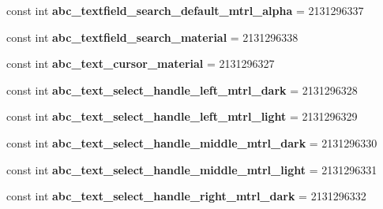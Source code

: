 \begin{DoxyCompactItemize}
const int {\bfseries abc\+\_\+textfield\+\_\+search\+\_\+default\+\_\+mtrl\+\_\+alpha} = 2131296337
\item 
\mbox{\label{classst_delivery_1_1_resource_1_1_drawable_a6d89a5a9436ef0975857610907eb5f20}} 
const int {\bfseries abc\+\_\+textfield\+\_\+search\+\_\+material} = 2131296338
\item 
\mbox{\label{classst_delivery_1_1_resource_1_1_drawable_a0cc3cac1396589d7ee1522c457b14227}} 
const int {\bfseries abc\+\_\+text\+\_\+cursor\+\_\+material} = 2131296327
\item 
\mbox{\label{classst_delivery_1_1_resource_1_1_drawable_a048ab4640415f05f9029504472f42b7c}} 
const int {\bfseries abc\+\_\+text\+\_\+select\+\_\+handle\+\_\+left\+\_\+mtrl\+\_\+dark} = 2131296328
\item 
\mbox{\label{classst_delivery_1_1_resource_1_1_drawable_abffb3b9f67fa9042c8ed29ab31198b34}} 
const int {\bfseries abc\+\_\+text\+\_\+select\+\_\+handle\+\_\+left\+\_\+mtrl\+\_\+light} = 2131296329
\item 
\mbox{\label{classst_delivery_1_1_resource_1_1_drawable_a78ee71500ae1a8889a3998488ae3a989}} 
const int {\bfseries abc\+\_\+text\+\_\+select\+\_\+handle\+\_\+middle\+\_\+mtrl\+\_\+dark} = 2131296330
\item 
\mbox{\label{classst_delivery_1_1_resource_1_1_drawable_ad3fc03fe4075bd439a973d828a578fda}} 
const int {\bfseries abc\+\_\+text\+\_\+select\+\_\+handle\+\_\+middle\+\_\+mtrl\+\_\+light} = 2131296331
\item 
\mbox{\label{classst_delivery_1_1_resource_1_1_drawable_a3179fa3704b6565abeeb8575c3c43ef5}} 
const int {\bfseries abc\+\_\+text\+\_\+select\+\_\+handle\+\_\+right\+\_\+mtrl\+\_\+dark} = 2131296332
\item 
\mbox{\label{classst_delivery_1_1_resource_1_1_drawable_aadf778b93c67ffc1a3763fa3c0964a80}} 

\end{DoxyCompactItemize}
